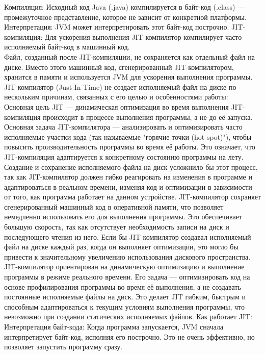 {Компиляция: Исходный код Java (.java) компилируется в байт-код (.class) — промежуточное представление, которое не зависит от конкретной платформы. Интерпретация: JVM может интерпретировать этот байт-код построчно. JIT-компиляция: Для ускорения выполнения JIT-компилятор компилирует часто исполняемый байт-код в машинный код. \\
Файл, созданный после JIT-компиляции, не сохраняется как отдельный файл на диске. Вместо этого машинный код, сгенерированный JIT-компилятором, хранится в памяти и используется JVM для ускорения выполнения программы. JIT-компилятор (Just-In-Time) не создает исполняемый файл на диске по нескольким причинам, связанных с его целью и особенностями работы: \\
Основная цель JIT — динамическая оптимизация во время выполнения JIT-компиляция происходит в процессе выполнения программы, а не до её запуска. Основная задача JIT-компилятора — анализировать и оптимизировать часто исполняемые участки кода (так называемые "горячие точки (hot spot)"), чтобы повысить производительность программы во время её работы. Это означает, что JIT-компиляция адаптируется к конкретному состоянию программы на лету. Создание и сохранение исполняемого файла на диск усложнило бы этот процесс, так как JIT-компилятор должен гибко реагировать на изменения в программе и адаптироваться в реальном времени, изменяя код и оптимизации в зависимости от того, как программа работает на данном устройстве. JIT-компилятор сохраняет сгенерированный машинный код в оперативной памяти, что позволяет немедленно использовать его для выполнения программы. Это обеспечивает большую скорость, так как отсутствует необходимость записи на диск и последующего чтения из него. Если бы JIT компилятор создавал исполняемый файл на диске каждый раз, когда он выполняет оптимизации, это могло бы привести к значительному увеличению использования дискового пространства. \\
JIT-компилятор ориентирован на динамическую оптимизацию и выполнение программы в режиме реального времени. Его задача — оптимизировать код на основе профилирования программы во время её выполнения, а не создавать постоянные исполняемые файлы на диск. Это делает JIT гибким, быстрым и способным адаптироваться к текущим условиям выполнения программы, что невозможно при создании статических исполняемых файлов.
Как работает JIT: \\
Интерпретация байт-кода: Когда программа запускается, JVM сначала интерпретирует байт-код, исполняя его построчно. Это не очень эффективно, но позволяет запустить программу сразу.
}
